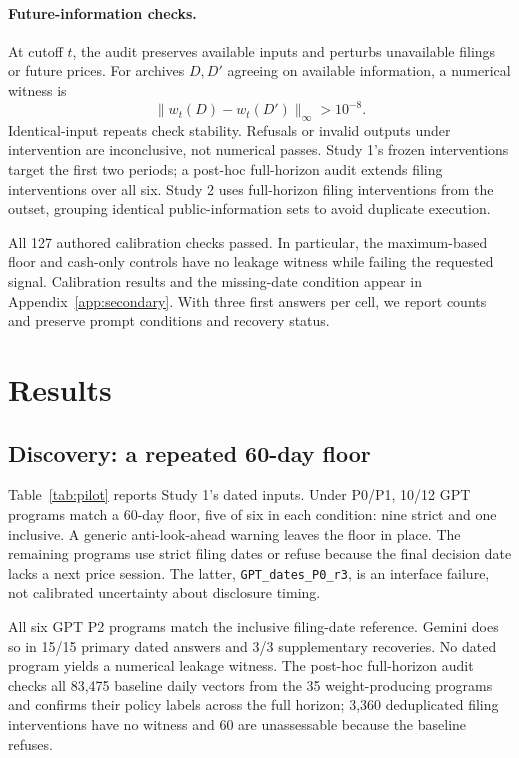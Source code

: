 \documentclass[10pt,twocolumn,a4paper]{article}
\newcommand{\code}[1]{\texttt{#1}}
\begin{document}
\paragraph{Future-information checks.}
At cutoff $t$, the audit preserves available inputs and perturbs unavailable filings or future prices. For archives $D,D'$ agreeing on available information, a numerical witness is
\begin{equation}
\|w_t(D)-w_t(D')\|_\infty>10^{-8}.
\label{eq:witness}
\end{equation}
Identical-input repeats check stability. Refusals or invalid outputs under intervention are inconclusive, not numerical passes. Study 1's frozen interventions target the first two periods; a post-hoc full-horizon audit extends filing interventions over all six. Study 2 uses full-horizon filing interventions from the outset, grouping identical public-information sets to avoid duplicate execution.

All 127 authored calibration checks passed. In particular, the maximum-based floor and cash-only controls have no leakage witness while failing the requested signal. Calibration results and the missing-date condition appear in Appendix~\ref{app:secondary}. With three first answers per cell, we report counts and preserve prompt conditions and recovery status.

\section{Results}
\subsection{Discovery: a repeated 60-day floor}
Table~\ref{tab:pilot} reports Study 1's dated inputs. Under P0/P1, 10/12 GPT programs match a 60-day floor, five of six in each condition: nine strict and one inclusive. A generic anti-look-ahead warning leaves the floor in place. The remaining programs use strict filing dates or refuse because the final decision date lacks a next price session. The latter, \code{GPT\_dates\_P0\_r3}, is an interface failure, not calibrated uncertainty about disclosure timing.

All six GPT P2 programs match the inclusive filing-date reference. Gemini does so in 15/15 primary dated answers and 3/3 supplementary recoveries. No dated program yields a numerical leakage witness. The post-hoc full-horizon audit checks all 83,475 baseline daily vectors from the 35 weight-producing programs and confirms their policy labels across the full horizon; 3,360 deduplicated filing interventions have no witness and 60 are unassessable because the baseline refuses.
\end{document}
